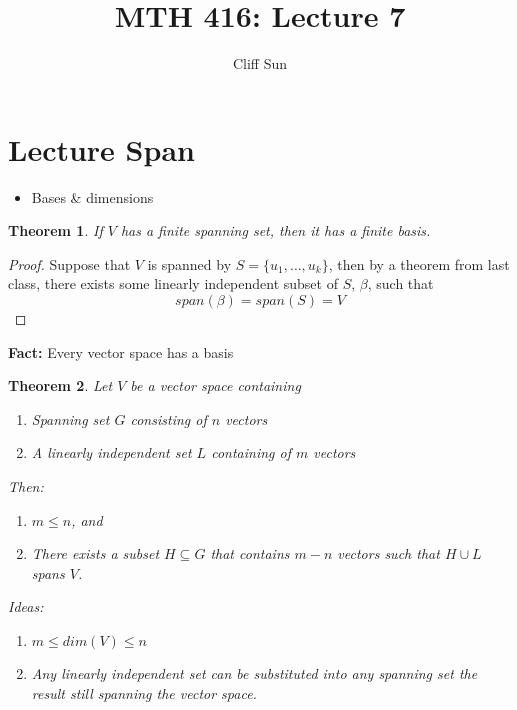 \documentclass{article}
\title{MTH 416: Lecture 7}
\author{Cliff Sun}
\newtheorem{theorem}{Theorem}[section]
\newtheorem{one minute paper}[theorem]{One Minute Paper}
\begin{document}
\maketitle

\section*{Lecture Span}
\begin{itemize}
    \item Bases \& dimensions
\end{itemize}

\begin{theorem}
    If $V$ has a finite spanning set, then it has a finite basis. 
\end{theorem}

\begin{proof}
    Suppose that $V$ is spanned by $S = \{u_1, \dots, u_k\}$, then by a theorem from last class, there exists some linearly independent subset of $S$, $\beta$,
    such that
    \begin{equation}
        span(\beta) = span(S) = V
    \end{equation}
\end{proof}

\textbf{Fact:} Every vector space has a basis

\begin{theorem}
    Let $V$ be a vector space containing 
    \begin{enumerate}
        \item Spanning set $G$ consisting of $n$ vectors
        \item A linearly independent set $L$ containing of $m$ vectors
    \end{enumerate}
    Then:
    \begin{enumerate}
        \item $m \leq n$, and
        \item There exists a subset $H \subseteq G$ that contains $m - n$ vectors such that $H \cup L$ spans $V$. 
    \end{enumerate}
    Ideas:
    \begin{enumerate}
        \item $m \leq dim(V) \leq n$
        \item Any linearly independent set can be substituted into any spanning set the result still spanning the vector space. 
    \end{enumerate}
\end{theorem}
\end{document}
